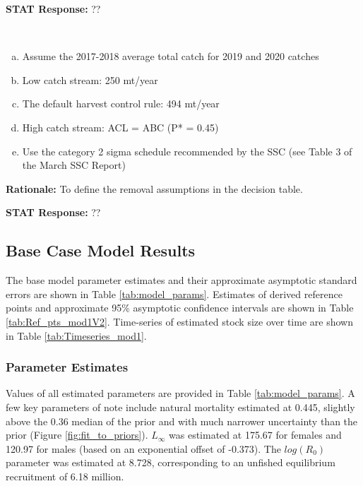 \documentclass[12pt,]{article}
\begin{document}
\begin{description}[style=sameline]
\textbf{STAT Response:} ??

\item[Request 7: Catch streams for the decision table should be as follows:] \hfill\\

\begin{enumerate}[(a)]\bfseries

\item Assume the 2017-2018 average total catch for 2019 and 2020 catches
\item Low catch stream: 250 mt/year
\item The default harvest control rule: 494 mt/year
\item High catch stream: ACL = ABC (P* = 0.45)
\item Use the category 2 sigma schedule recommended by the SSC (see Table 3 of the March SSC Report)

\end{enumerate}

\vspace{.4cm}

\textbf{Rationale:} To define the removal assumptions in the decision table.

\vspace{.4cm}

\textbf{STAT Response:} ??

\end{description}

\hypertarget{base-case-model-results}{%
\subsection{Base Case Model Results}\label{base-case-model-results}}

The base model parameter estimates and their approximate asymptotic
standard errors are shown in Table \ref{tab:model_params}. Estimates of
derived reference points and approximate 95\% asymptotic confidence
intervals are shown in Table \ref{tab:Ref_pts_mod1V2}. Time-series of
estimated stock size over time are shown in Table
\ref{tab:Timeseries_mod1}.

\hypertarget{parameter-estimates}{%
\subsubsection{Parameter Estimates}\label{parameter-estimates}}

Values of all estimated parameters are provided in Table
\ref{tab:model_params}. A few key parameters of note include natural
mortality estimated at 0.445, slightly above the 0.36 median of the
prior and with much narrower uncertainty than the prior (Figure
\ref{fig:fit_to_priors}). \(L_\infty\) was estimated at 175.67 for
females and 120.97 for males (based on an exponential offset of -0.373).
The \(log(R_0)\) parameter was estimated at 8.728, corresponding to an
unfished equilibrium recruitment of 6.18 million.
\end{document}
